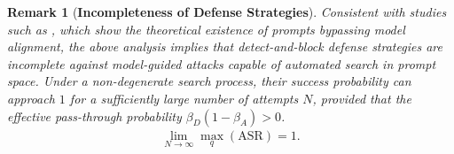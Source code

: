 \documentclass[conference,compsoc]{IEEEtran}
\newtheorem{remark}{Remark}
\begin{document}
\begin{remark}[\textbf{Incompleteness of Defense Strategies}]
    Consistent with studies such as \cite{su2024mission_impossible}, which show the theoretical existence of prompts bypassing model alignment, the above analysis implies that detect-and-block defense strategies are incomplete against model-guided attacks capable of automated search in prompt space. Under a non-degenerate search process, their success probability can approach $1$ for a sufficiently large number of attempts $N$, provided that the effective pass-through probability $\beta_D(1-\beta_A)>0$.
    \begin{align}\label{eq:rem1}
        \lim_{N\to\infty} \max_q(\mathrm{ASR}) = 1 .
    \end{align}
\end{remark}
\end{document}
